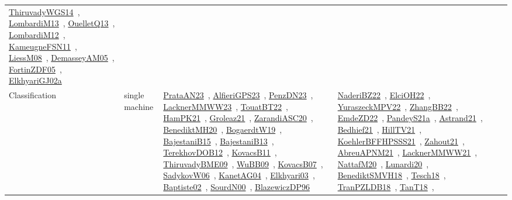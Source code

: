 {\begin{longtable}{lp{3cm}>{\raggedright\arraybackslash}p{6cm}>{\raggedright\arraybackslash}p{6cm}>{\raggedright\arraybackslash}p{8cm}}
\href{works/ThiruvadyWGS14.pdf}{ThiruvadyWGS14}~\cite{ThiruvadyWGS14}, \href{works/LombardiM13.pdf}{LombardiM13}~\cite{LombardiM13}, \href{works/OuelletQ13.pdf}{OuelletQ13}~\cite{OuelletQ13}, \href{works/LombardiM12.pdf}{LombardiM12}~\cite{LombardiM12}, \href{works/KameugneFSN11.pdf}{KameugneFSN11}~\cite{KameugneFSN11}, \href{works/LiessM08.pdf}{LiessM08}~\cite{LiessM08}, \href{works/DemasseyAM05.pdf}{DemasseyAM05}~\cite{DemasseyAM05}, \href{works/FortinZDF05.pdf}{FortinZDF05}~\cite{FortinZDF05}, \href{works/ElkhyariGJ02a.pdf}{ElkhyariGJ02a}~\cite{ElkhyariGJ02a}\\
Classification & single machine & \href{works/PrataAN23.pdf}{PrataAN23}~\cite{PrataAN23}, \href{works/AlfieriGPS23.pdf}{AlfieriGPS23}~\cite{AlfieriGPS23}, \href{works/PenzDN23.pdf}{PenzDN23}~\cite{PenzDN23}, \href{works/LacknerMMWW23.pdf}{LacknerMMWW23}~\cite{LacknerMMWW23}, \href{works/TouatBT22.pdf}{TouatBT22}~\cite{TouatBT22}, \href{works/HamPK21.pdf}{HamPK21}~\cite{HamPK21}, \href{works/Groleaz21.pdf}{Groleaz21}~\cite{Groleaz21}, \href{works/ZarandiASC20.pdf}{ZarandiASC20}~\cite{ZarandiASC20}, \href{works/BenediktMH20.pdf}{BenediktMH20}~\cite{BenediktMH20}, \href{works/BogaerdtW19.pdf}{BogaerdtW19}~\cite{BogaerdtW19}, \href{works/BajestaniB15.pdf}{BajestaniB15}~\cite{BajestaniB15}, \href{works/BajestaniB13.pdf}{BajestaniB13}~\cite{BajestaniB13}, \href{works/TerekhovDOB12.pdf}{TerekhovDOB12}~\cite{TerekhovDOB12}, \href{works/KovacsB11.pdf}{KovacsB11}~\cite{KovacsB11}, \href{works/ThiruvadyBME09.pdf}{ThiruvadyBME09}~\cite{ThiruvadyBME09}, \href{works/WuBB09.pdf}{WuBB09}~\cite{WuBB09}, \href{works/KovacsB07.pdf}{KovacsB07}~\cite{KovacsB07}, \href{works/SadykovW06.pdf}{SadykovW06}~\cite{SadykovW06}, \href{works/KanetAG04.pdf}{KanetAG04}~\cite{KanetAG04}, \href{works/Elkhyari03.pdf}{Elkhyari03}~\cite{Elkhyari03}, \href{works/Baptiste02.pdf}{Baptiste02}~\cite{Baptiste02}, \href{works/SourdN00.pdf}{SourdN00}~\cite{SourdN00}, \href{works/BlazewiczDP96.pdf}{BlazewiczDP96}~\cite{BlazewiczDP96} & \href{works/NaderiBZ22.pdf}{NaderiBZ22}~\cite{NaderiBZ22}, \href{works/ElciOH22.pdf}{ElciOH22}~\cite{ElciOH22}, \href{works/YuraszeckMPV22.pdf}{YuraszeckMPV22}~\cite{YuraszeckMPV22}, \href{works/ZhangBB22.pdf}{ZhangBB22}~\cite{ZhangBB22}, \href{works/EmdeZD22.pdf}{EmdeZD22}~\cite{EmdeZD22}, \href{works/PandeyS21a.pdf}{PandeyS21a}~\cite{PandeyS21a}, \href{works/Astrand21.pdf}{Astrand21}~\cite{Astrand21}, \href{works/Bedhief21.pdf}{Bedhief21}~\cite{Bedhief21}, \href{works/HillTV21.pdf}{HillTV21}~\cite{HillTV21}, \href{works/KoehlerBFFHPSSS21.pdf}{KoehlerBFFHPSSS21}~\cite{KoehlerBFFHPSSS21}, \href{works/Zahout21.pdf}{Zahout21}~\cite{Zahout21}, \href{works/AbreuAPNM21.pdf}{AbreuAPNM21}~\cite{AbreuAPNM21}, \href{works/LacknerMMWW21.pdf}{LacknerMMWW21}~\cite{LacknerMMWW21}, \href{works/NattafM20.pdf}{NattafM20}~\cite{NattafM20}, \href{works/Lunardi20.pdf}{Lunardi20}~\cite{Lunardi20}, \href{works/BenediktSMVH18.pdf}{BenediktSMVH18}~\cite{BenediktSMVH18}, \href{works/Tesch18.pdf}{Tesch18}~\cite{Tesch18}, \href{works/TranPZLDB18.pdf}{TranPZLDB18}~\cite{TranPZLDB18}, \href{works/TanT18.pdf}{TanT18}~\cite{TanT18}, 
\end{longtable}}
